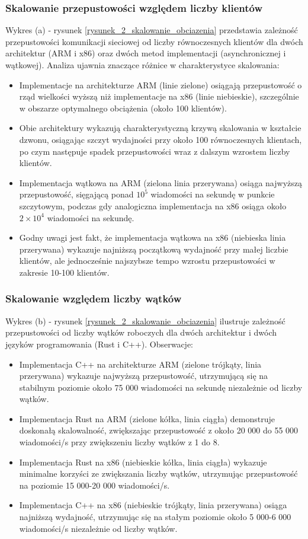 \subsubsection{Skalowanie przepustowości względem liczby klientów}
Wykres (a) - rysunek \ref{rysunek_2_skalowanie_obciazenia} przedstawia zależność przepustowości komunikacji sieciowej od liczby równoczesnych klientów dla dwóch architektur (ARM i x86) oraz dwóch metod implementacji (asynchronicznej i wątkowej). Analiza ujawnia znaczące różnice w charakterystyce skalowania:
\begin{itemize}
    \item Implementacje na architekturze ARM (linie zielone) osiągają przepustowość o rząd wielkości wyższą niż implementacje na x86 (linie niebieskie), szczególnie w obszarze optymalnego obciążenia (około 100 klientów).
    \item Obie architektury wykazują charakterystyczną krzywą skalowania w kształcie dzwonu, osiągając szczyt wydajności przy około 100 równoczesnych klientach, po czym następuje spadek przepustowości wraz z dalszym wzrostem liczby klientów.
    \item Implementacja wątkowa na ARM (zielona linia przerywana) osiąga najwyższą przepustowość, sięgającą ponad $10^5$ wiadomości na sekundę w punkcie szczytowym, podczas gdy analogiczna implementacja na x86 osiąga około $2\times10^4$ wiadomości na sekundę.
    \item Godny uwagi jest fakt, że implementacja wątkowa na x86 (niebieska linia przerywana) wykazuje najniższą początkową wydajność przy małej liczbie klientów, ale jednocześnie najszybsze tempo wzrostu przepustowości w zakresie 10-100 klientów.
\end{itemize}


\subsubsection{Skalowanie względem liczby wątków}
Wykres (b) - rysunek \ref{rysunek_2_skalowanie_obciazenia} ilustruje zależność przepustowości od liczby wątków roboczych dla dwóch architektur i dwóch języków programowania (Rust i C++). Obserwacje:
\begin{itemize}
    \item Implementacja C++ na architekturze ARM (zielone trójkąty, linia przerywana) wykazuje najwyższą przepustowość, utrzymującą się na stabilnym poziomie około 75 000 wiadomości na sekundę niezależnie od liczby wątków.
    \item Implementacja Rust na ARM (zielone kółka, linia ciągła) demonstruje doskonałą skalowalność, zwiększając przepustowość z około 20 000 do 55 000 wiadomości/s przy zwiększeniu liczby wątków z 1 do 8.
    \item Implementacja Rust na x86 (niebieskie kółka, linia ciągła) wykazuje minimalne korzyści ze zwiększania liczby wątków, utrzymując przepustowość na poziomie 15 000-20 000 wiadomości/s.
    \item Implementacja C++ na x86 (niebieskie trójkąty, linia przerywana) osiąga najniższą wydajność, utrzymując się na stałym poziomie około 5 000-6 000 wiadomości/s niezależnie od liczby wątków.
\end{itemize}

